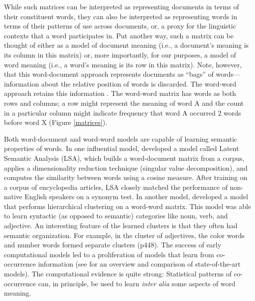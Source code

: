 \documentclass[man,floatsintext]{apa6}
\begin{document}
While such matrices can be interpreted as representing documents in terms of their constituent words, they can also be interpreted as representing words in terms of their patterns of use across documents, or, a proxy for the linguistic contexts that a word participates in. Put another way, such a matrix can be thought of either as a model of document meaning (i.e., a document's meaning is its column in this matrix) or, more importantly, for our purposes, a model of word meaning (i.e., a word's meaning is its row in this matrix). Note, however, that this word-document approach represents documents as ``bags'' of words---information about the relative position of words is discarded. The word-word approach retains this information \citep{church1990, schutze1992}. The word-word matrix has words as both rows and columns; a row might represent the meaning of word A and the count in a particular column might indicate frequency that word A occurred 2 words before word X (Figure \ref{matrices}).

Both word-document and word-word models are capable of learning semantic properties of words. In one influential model, \citet{landauer1997} developed a model called Latent Semantic Analysis (LSA), which builds a word-document matrix from a corpus, applies a dimensionality reduction technique (singular value decomposition), and computes the similarity between words using a cosine measure. After training on a corpus of encyclopedia articles, LSA closely matched the performance of non-native English speakers on a synonym test. In another model, \citet{redington1998} developed a model that performs hierarchical clustering on a word-word matrix. This model was able to learn syntactic (as opposed to semantic) categories like noun, verb, and adjective. An interesting feature of the learned clusters is that they often had semantic organization. For example, in the cluster of adjectives, the color words and number words formed separate clusters (p448). The success of early computational models led to a proliferation of models that learn from co-occurrence information (see \citealp{riordan2010} for an overview and comparison of state-of-the-art models). The computational evidence is quite strong: Statistical patterns of co-occurrence can, in principle, be used to learn \emph{inter alia} some aspects of word meaning.
\end{document}
